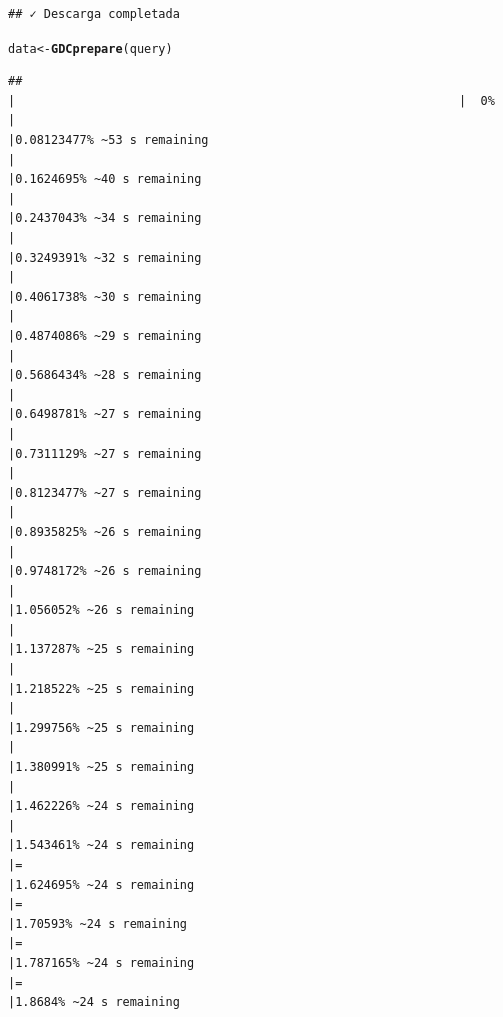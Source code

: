 \documentclass{article}\usepackage[]{graphicx}\usepackage[]{xcolor}
\makeatletter
\newcommand{\hldef}[1]{\textcolor[rgb]{0.345,0.345,0.345}{#1}}%
\newcommand{\hlkwb}[1]{\textcolor[rgb]{0.69,0.353,0.396}{#1}}%
\newcommand{\hlkwd}[1]{\textcolor[rgb]{0.737,0.353,0.396}{\textbf{#1}}}%
\newenvironment{kframe}{%
 \def\at@end@of@kframe{}%
 \ifinner\ifhmode%
  \def\at@end@of@kframe{\end{minipage}}%
  \begin{minipage}{\columnwidth}%
 \fi\fi%
 \def\FrameCommand##1{\hskip\@totalleftmargin \hskip-\fboxsep
 \colorbox{shadecolor}{##1}\hskip-\fboxsep
     \hskip-\linewidth \hskip-\@totalleftmargin \hskip\columnwidth}%
 \MakeFramed {\advance\hsize-\width
   \@totalleftmargin\z@ \linewidth\hsize
   \@setminipage}}%
 {\par\unskip\endMakeFramed%
 \at@end@of@kframe}
\newenvironment{knitrout}{}{} %
\makeatother
\begin{document}
\begin{knitrout}
\begin{kframe}
{\ttfamily\noindent\itshape\color{messagecolor}{\#\# All samples have been already downloaded}}\begin{verbatim}
## ✓ Descarga completada
\end{verbatim}
\begin{alltt}
\hldef{data} \hlkwb{<-} \hlkwd{GDCprepare}\hldef{(query)}
\end{alltt}
\begin{verbatim}
## 
|                                                              |  0%                      
|                                                              |0.08123477% ~53 s remaining
|                                                              |0.1624695% ~40 s remaining
|                                                              |0.2437043% ~34 s remaining
|                                                              |0.3249391% ~32 s remaining
|                                                              |0.4061738% ~30 s remaining
|                                                              |0.4874086% ~29 s remaining
|                                                              |0.5686434% ~28 s remaining
|                                                              |0.6498781% ~27 s remaining
|                                                              |0.7311129% ~27 s remaining
|                                                              |0.8123477% ~27 s remaining
|                                                              |0.8935825% ~26 s remaining
|                                                              |0.9748172% ~26 s remaining
|                                                              |1.056052% ~26 s remaining 
|                                                              |1.137287% ~25 s remaining 
|                                                              |1.218522% ~25 s remaining 
|                                                              |1.299756% ~25 s remaining 
|                                                              |1.380991% ~25 s remaining 
|                                                              |1.462226% ~24 s remaining 
|                                                              |1.543461% ~24 s remaining 
|=                                                             |1.624695% ~24 s remaining 
|=                                                             |1.70593% ~24 s remaining  
|=                                                             |1.787165% ~24 s remaining 
|=                                                             |1.8684% ~24 s remaining   

\end{verbatim}
\end{kframe}
\end{knitrout}
\end{document}
